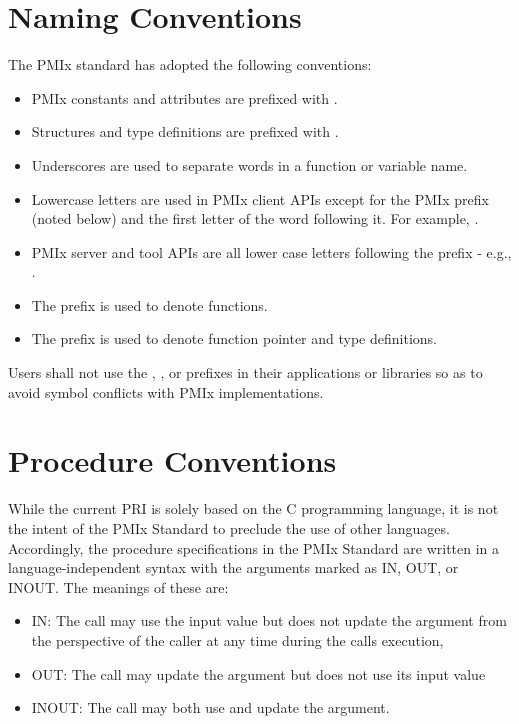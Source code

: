 \section{Naming Conventions}

The \ac{PMIx} standard has adopted the following conventions:

\begin{itemize}
\item \ac{PMIx} constants and attributes are prefixed with \textbf{}.
\item Structures and type definitions are prefixed with .
\item Underscores are used to separate words in a function or variable name.
\item Lowercase letters are used in \ac{PMIx} client \acp{API} except for the \ac{PMIx} prefix (noted below) and the first letter of the word following it.
For example, .
\item \ac{PMIx} server and tool \acp{API} are all lower case letters following the prefix - e.g., .
\item The  prefix is used to denote functions.
\item The  prefix is used to denote function pointer and type definitions.
\end{itemize}

Users shall not use the \textbf{}, \textbf{}, or \textbf{} prefixes in their applications or libraries so as to avoid symbol conflicts with \ac{PMIx} implementations.
 
\section{Procedure Conventions}

While the current \acf{PRI} is solely based on the C programming language, it is not the intent of the \ac{PMIx} Standard to preclude the use of other languages.
Accordingly, the procedure specifications in the \ac{PMIx} Standard are written in a language-independent syntax with the arguments marked as IN, OUT, or INOUT.
The meanings of these are:
\begin{itemize}
\item IN:
The call may use the input value but does not update the argument from the perspective of the caller at any time during the calls execution,
\item OUT:
The call may update the argument but does not use its input value
\item INOUT:
The call may both use and update the argument.
\end{itemize}


